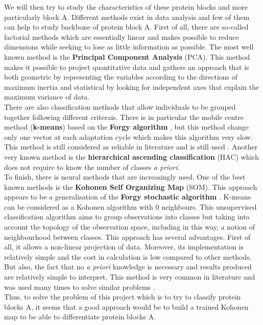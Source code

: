 \documentclass[11pt,a4paper]{article}
\begin{document}
    We will then try to study the characteristics of these protein blocks and more particularly block A. Different methods exist in data analysis and few of them can help to study backbone of protein block A. First of all, there are so-called factorial methods which are essentially linear and makes possible to reduce dimensions while seeking to lose as little information as possible. The most well known method is the \textbf{Principal Component Analysis} (PCA). This method makes it possible to project quantitative data and gathers an approach that is both geometric by representing the variables according to the directions of maximum inertia and statistical by looking for independent axes that explain the maximum variance of data.\\
    There are also classification methods that allow individuals to be grouped together following different criterais. There is in particular the mobile centre method (\textbf{k-means}) based on the \textbf{Forgy algorithm} \cite{macqueen1967}, but this method change only one vector at each adaptation cycle which makes this algorithm very slow. This method is still considered as reliable in literature and is still used \cite{bouvier_evrard-todeschi_girault_bertho_2009}. Another very known method is the \textbf{hierarchical ascending classification} (HAC) which does not require to know the number of classes \textit{a priori}.\\
    To finish, there is neural methods that are increasingly used. One of the best known methods is the \textbf{Kohonen Self Organizing Map} (SOM). This approach appears to be a generalisation of the \textbf{Forgy stochastic algorithm} \cite{macqueen1967}. K-means can be considered as a Kohonen algorithm with 0 neighbours. This unsupervised classification algorithm aims to group observations into classes but taking into account the topology of the observation space, including in this way, a notion of neighbourhood between classes. This approach has several advantages. First of all, it allows a non-linear projection of data. Moreover, its implementation is relatively simple and the cost in calculation is low compared to other methods. But also, the fact that no \textit{a priori} knowledge is necessary and results produced are relatively simple to interpret. This method is very common in literature and was used many times to solve similar problems \cite{bouvier_evrard-todeschi_girault_bertho_2009} \cite{schuchhardt_schneider_reichelt_schomburg_wrede_1996} \cite{brevern_etchebest_hazout_2000}.\\
    Thus, to solve the problem of this project which is to try to classify protein blocks A, it seems that a good approach would be to build a trained Kohonen map to be able to differentiate protein blocks A.
    
\end{document}
